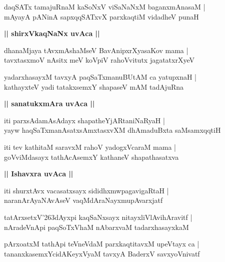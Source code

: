 \documentclass[twoside,12pt,openright]{book}
\def\S{\char'263}
\newcounter{shloka}[chapter]
\def\uvaca#1{\centerline{{\large\textbf{#1}}}}
\begin{document}
\begin{shloka}%
daqSATx tamajuRnaM kaSoNxV viSaNaNxM baganxmAnasaM |\\
mAyayA pANinA sapxqqSATxvX parxkaqtiM vidadheV punaH 
\end{shloka}

\uvaca{|| shirxVkaqNaNx uvAca ||}

\begin{shloka}%
dhanaMjaya tAvxmAshaMseV BavAnipxrXyasaKov mama |\\
tavxtasxmoV nAsitx meV koVpiV rahoVvitutx jagatatxrXyeV
\end{shloka}

\begin{shloka}%
yadarxhasayxM tavxyA paqSaTxmanuBUtAM ca yatupxnaH |\\
kathayxteV yadi tatakxsemxY shapaseV mAM tadAjuRna
\end{shloka}

\uvaca{|| sanatukxmAra uvAca ||}

\begin{shloka}%
iti parxsAdamAsAdayx shapatheYjARtaniNaRyaH |\\
yayw haqSaTxmanAsatxsAmxtasxvXM  dhAmaduBxta saMsamxqqtiH
\end{shloka}

\begin{shloka}%
iti tev kathitaM saravxM rahoV yadogxVcaraM mama |\\
goVviMdasayx tathAcAsemxY kathaneV shapathasatxva
\end{shloka}

\uvaca{|| Ishavxra uvAca ||}

\begin{shloka}%
iti shurxtAvx vacasatxsayx sididhxmwpagavigaRtaH |\\
naranArAyaNAvAseV vaqMdAraNayxmupAvarxjatf
\end{shloka}

\begin{shloka}%
tatArxsetxV\S dAyxpi kaqSaNxsayx nitayxliVlAvihAravitf |\\
nAradeVnApi paqSoTxVhaM nAbarxvaM tadarxhasayxkaM 
\end{shloka}

\begin{shloka}%
pArxoatxM tathApi teVneVdaM parxkaqtitavxM upeVtayx ca |\\
tananxkasemxYcidAKeyxVyaM tavxyA BaderxV savxyoVnivatf 
\end{shloka}
\end{document}
